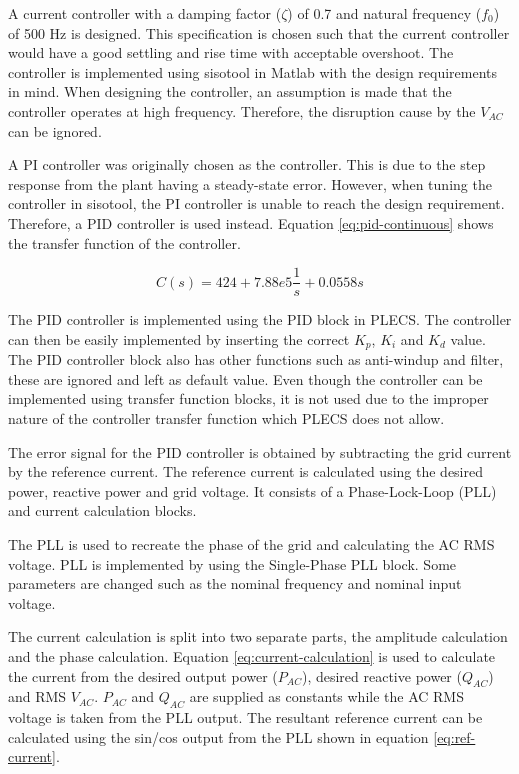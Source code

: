 \documentclass[12pt]{article}
\begin{document}
A current controller with a damping factor ($\zeta$) of 0.7 and natural frequency ($f_0$) of 500 Hz is designed.
This specification is chosen such that the current controller would have a good settling and rise time with acceptable overshoot.
The controller is implemented using sisotool in Matlab with the design requirements in mind.
When designing the controller, an assumption is made that the controller operates at high frequency.
Therefore, the disruption cause by the $V_{AC}$ can be ignored.

A PI controller was originally chosen as the controller.
This is due to the step response from the plant having a steady-state error.
However, when tuning the controller in sisotool, the PI controller is unable to reach the design requirement.
Therefore, a PID controller is used instead.
Equation \ref{eq:pid-continuous} shows the transfer function of the controller.

\begin{equation} \label{eq:pid-continuous}
    C(s) = 424 + 7.88e5 \frac{1}{s} + 0.0558 s
\end{equation}

The PID controller is implemented using the PID block in PLECS.
The controller can then be easily implemented by inserting the correct $K_p$, $K_i$ and $K_d$ value.
The PID controller block also has other functions such as anti-windup and filter, these are ignored and left as default value.
Even though the controller can be implemented using transfer function blocks, it is not used due to the improper nature of the controller transfer function which PLECS does not allow.

The error signal for the PID controller is obtained by subtracting the grid current by the reference current.
The reference current is calculated using the desired power, reactive power and grid voltage.
It consists of a Phase-Lock-Loop (PLL) and current calculation blocks.

The PLL is used to recreate the phase of the grid and calculating the AC RMS voltage.
PLL is implemented by using the Single-Phase PLL block.
Some parameters are changed such as the nominal frequency and nominal input voltage.

The current calculation is split into two separate parts, the amplitude calculation and the phase calculation.
Equation \ref{eq:current-calculation} is used to calculate the current from the desired output power ($P_{AC}$), desired reactive power ($Q_{AC}$) and RMS $V_{AC}$.
$P_{AC}$ and $Q_{AC}$ are supplied as constants while the AC RMS voltage is taken from the PLL output.
The resultant reference current can be calculated using the sin/cos output from the PLL shown in equation \ref{eq:ref-current}.
\end{document}
